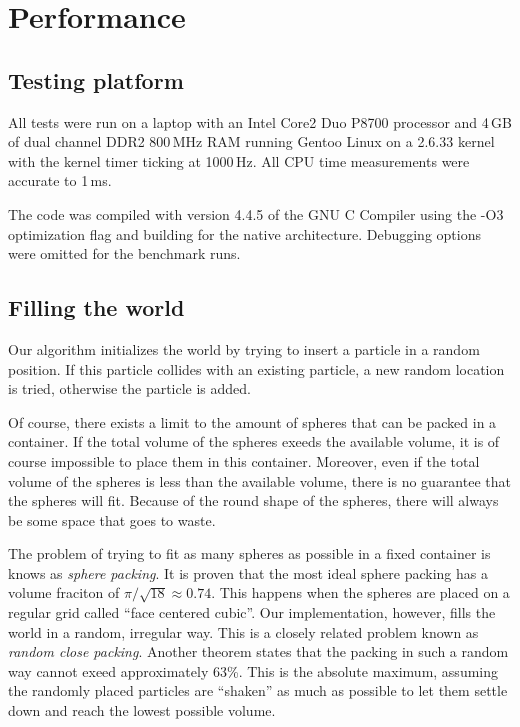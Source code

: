 
\section{Performance}
\subsection{Testing platform}

All tests were run on a laptop with an Intel Core2 Duo P8700 processor and 
4\,GB of dual channel DDR2 800\,MHz RAM running Gentoo Linux on a 2.6.33 
kernel with the kernel timer ticking at 1000\,Hz. All CPU time measurements 
were accurate to 1\,ms.

The code was compiled with version 4.4.5 of the GNU C Compiler using the 
-O3 optimization flag and building for the native architecture. Debugging  
options were omitted for the benchmark runs.


\subsection{Filling the world}
Our algorithm initializes the world by trying to insert a particle in a 
random position. If this particle collides with an existing particle, a new 
random location is tried, otherwise the particle is added.

Of course, there exists a limit to the amount of spheres that can be packed 
in a container. If the total volume of the spheres exeeds the available 
volume, it is of course impossible to place them in this container.  
Moreover, even if the total volume of the spheres is less than the 
available volume, there is no guarantee that the spheres will fit. Because 
of the round shape of the spheres, there will always be some space that 
goes to waste.

The problem of trying to fit as many spheres as possible in a fixed 
container is knows as \emph{sphere packing}. It is proven\cite{idealPacking}
that the most ideal sphere packing has a volume fraciton of $\pi / \sqrt{18}
\approx 0.74$. This happens when the spheres are placed on a regular grid
called  ``face centered cubic''. Our implementation, however, fills the 
world in a random, irregular way. This is a closely related problem known 
as \emph{random close packing}. Another theorem\cite{randomPacking} states 
that the packing in such a random way cannot exeed approximately 63\%. This 
is the absolute maximum, assuming the randomly placed particles are 
``shaken'' as much as possible to let them settle down and reach the lowest 
possible volume.


